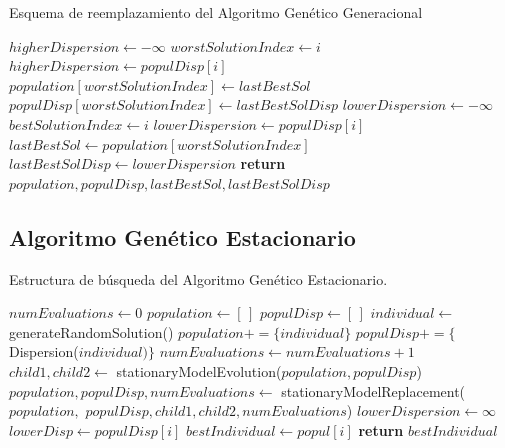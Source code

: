 \begin{algorithm}[H]
    \caption{Esquema de reemplazamiento del Algoritmo Genético Generacional}
\begin{algorithmic}
    \State $higherDispersion \leftarrow -\infty$
            \State $worstSolutionIndex \leftarrow i$
            \State $higherDispersion \leftarrow populDisp[i]$
        \EndIf
    \EndFor
    \State $population[worstSolutionIndex] \leftarrow lastBestSol$
    \State $populDisp[worstSolutionIndex] \leftarrow lastBestSolDisp$
    \State
    \State $lowerDispersion \leftarrow -\infty$
            \State $bestSolutionIndex \leftarrow i$
            \State $lowerDispersion \leftarrow populDisp[i]$
        \EndIf
    \EndFor
    \State $lastBestSol \leftarrow population[worstSolutionIndex]$
    \State $lastBestSolDisp \leftarrow lowerDispersion$
    \State
    \State \textbf{return} $population, populDisp, lastBestSol, lastBestSolDisp$
\EndProcedure
\end{algorithmic}
\end{algorithm}

\subsection{Algoritmo Genético Estacionario}
\begin{algorithm}[H]
    \caption{Estructura de búsqueda del Algoritmo Genético Estacionario.}
\begin{algorithmic}
    \State $numEvaluations \leftarrow 0$
    \State $population \leftarrow [ \, ]$
    \State $populDisp \leftarrow [ \, ]$
     
        \State $individual \leftarrow$ generateRandomSolution()
        \State $population += \{individual\}$
        \State $populDisp += \{$Dispersion($individual)\}$
        \State $numEvaluations \leftarrow numEvaluations + 1$
    \EndFor
    \State
        \State $child1, child2 \leftarrow$ stationaryModelEvolution($population, populDisp$)
        \State
        \State $population, populDisp, numEvaluations \leftarrow$ stationaryModelReplacement($population,$
        \State $populDisp, child1, child2, numEvaluations$)
    \EndWhile
    \State
    \State $lowerDispersion \leftarrow \infty$
            \State $lowerDisp \leftarrow populDisp[i]$
            \State $bestIndividual \leftarrow popul[i]$
        \EndIf
    \EndFor
    \State \textbf{return} $bestIndividual$
\EndProcedure
\end{algorithmic}
\end{algorithm}


